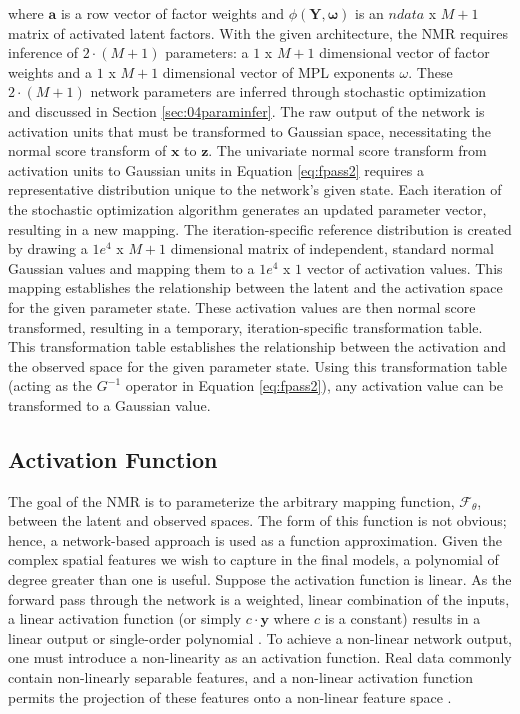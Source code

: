 \lowercase{Where} $\mathbf{a}$ is a row vector of factor weights and $\phi\left(\mathbf{Y}, \boldsymbol{\omega} \right)$ is an $ndata$ x $M+1$ matrix of activated latent factors. With the given architecture, the \gls{NMR} requires inference of $2 \cdot (M+1)$ parameters: a $1$ x $M+1$ dimensional vector of factor weights and a $1$ x $M+1$ dimensional vector of \gls{MPL} exponents $\omega$. These $2 \cdot (M+1)$ network parameters are inferred through stochastic optimization and discussed in Section \ref{sec:04paraminfer}. The raw output of the network is activation units that must be transformed to Gaussian space, necessitating the normal score transform of $\mathbf{x}$ to $\mathbf{z}$. The univariate normal score transform from activation units to Gaussian units in Equation \ref{eq:fpass2} requires a representative distribution unique to the network's given state. Each iteration of the stochastic optimization algorithm generates an updated parameter vector, resulting in a new mapping. The iteration-specific reference distribution is created by drawing a $1e^{4}$ x $M+1$ dimensional matrix of independent, standard normal Gaussian values and mapping them to a $1e^{4}$ x $1$ vector of activation values. This mapping establishes the relationship between the latent and the activation space for the given parameter state. These activation values are then normal score transformed, resulting in a temporary, iteration-specific transformation table. This transformation table establishes the relationship between the activation and the observed space for the given parameter state. Using this transformation table (acting as the $G^{-1}$ operator in Equation \ref{eq:fpass2}), any activation value can be transformed to a Gaussian value.

\subsection{Activation Function}
\label{subsec:04activation}

The goal of the \gls{NMR} is to parameterize the arbitrary mapping function, $\mathcal{F}_{\theta}$, between the latent and observed spaces. The form of this function is not obvious; hence, a network-based approach is used as a function approximation. Given the complex spatial features we wish to capture in the final models, a polynomial of degree greater than one is useful. Suppose the activation function is linear. As the forward pass through the network is a weighted, linear combination of the inputs, a linear activation function (or simply $c \cdot \mathbf{y}$ where $c$ is a constant) results in a linear output or single-order polynomial \citep{sharma2020activation}. To achieve a non-linear network output, one must introduce a non-linearity as an activation function. Real data commonly contain non-linearly separable features, and a non-linear activation function permits the projection of these features onto a non-linear feature space \citep{dubey2022activation}.

